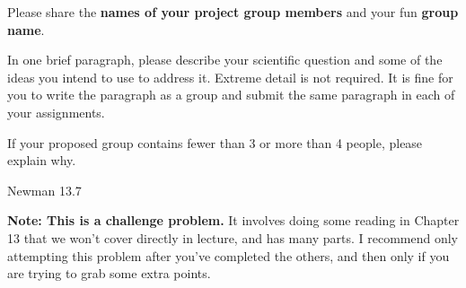 \documentclass{hw}
\begin{document}
\problem{}

Please share the \textbf{names of your project group members} and your fun \textbf{group name}. 
 
In one brief paragraph, please describe your scientific question and some of the ideas you intend to use to address it. 
Extreme detail is not required. 
It is fine for you to write the paragraph as a group and submit the same paragraph in each of your assignments. 

If your proposed group contains fewer than 3 or more than 4 people, please explain why. 


\problem{}

Newman 13.7

\textbf{Note: This is a challenge problem.} 
It involves doing some reading in Chapter 13 that we won't cover directly in lecture, and has many parts. 
I recommend only attempting this problem after you've completed the others, and then only if you are trying to grab some extra points.  
\end{document}
